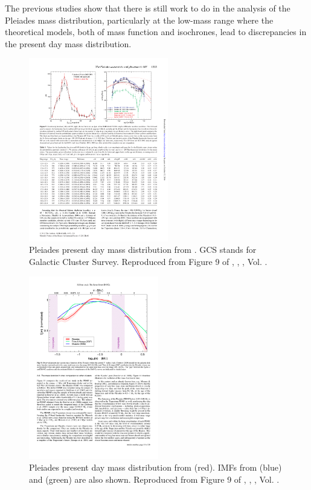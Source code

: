 The previous studies show that there is still work to do in the analysis of the Pleiades mass distribution, particularly at the low-mass range where the theoretical models, both of mass function and isochrones, lead to discrepancies in the present day mass distribution.  

\begin{figure}[ht!]
\begin{center}
\includegraphics[height=8cm]{background/Figures/F9b_Lodieu2012.pdf}
\caption{Pleiades present day mass distribution from \citet{Lodieu2012}. GCS stands for Galactic Cluster Survey. Reproduced from Figure 9 of \citet{Lodieu2012}, \textit{}, , Vol. .}
\label{fig:massLodieu}
\end{center}
\end{figure}

\begin{figure}[ht!]
\begin{center}
\includegraphics[height=8cm]{background/Figures/F9_Bouy2015.pdf}
\caption{Pleiades present day mass distribution  from \citet{Bouy2015} (red). IMFs from \citet{Chabrier2005}(blue) and \citet{Thies2007} (green) are also shown. Reproduced from Figure 9 of \citet{Bouy2015}, \textit{}, , Vol. .}
\label{fig:massBouy}
\end{center}
\end{figure}


